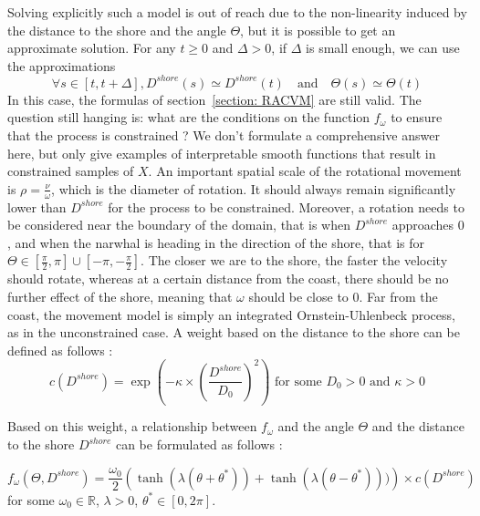 \documentclass[11pt]{article}
\newcommand {\R}{\mathbb{R}}
\newcommand {\1}{\mathbb{1}}
\theoremstyle{definition}
\theoremstyle{remark}
\theoremstyle{remark}
\begin{document}
Solving explicitly such a model is out of reach due to the non-linearity induced by the distance to the shore and the angle $\Theta$, but it is possible to get an approximate solution.
For any $t \geq 0$ and $\Delta>0$, if $\Delta$ is small enough, we can use the approximations
\[\forall s \in [t,t+\Delta], D^{shore}(s) \simeq D^{shore}(t) \quad \mbox{and} \quad  \Theta(s)\simeq \Theta(t)\]
In this case, the formulas of section~\ref{section: RACVM} are still valid.
The question still hanging is: what are the conditions on the function $f_{\omega}$ to ensure that the process is constrained ?
We don't formulate a comprehensive answer here, but only give examples of interpretable smooth functions that result in constrained samples of $X$.
An important spatial scale of the rotational movement is $\rho=\frac{\nu}{\omega}$, which is the diameter of rotation. It should always remain significantly lower than $D^{shore}$ for the process to be constrained. Moreover, a rotation needs to be considered near the boundary of the domain, that is when $D^{shore}$ approaches $0$, and when the narwhal is heading in the direction of the shore, that is for $\Theta \in \left[\frac{\pi}{2},\pi\right] \cup \left[-\pi,-\frac{\pi}{2}\right]$.
The closer we are to the shore, the faster the velocity should rotate,
whereas at a certain distance from the coast, there should be no further effect of the shore, meaning that $\omega$ should be close to $0$. Far from the coast, the movement model is simply an integrated Ornstein-Uhlenbeck process, as in the unconstrained case.
A weight based on the distance to the shore can be defined as follows :
\[c(D^{shore})=\exp\left(-\kappa \times \left(\frac{D^{shore}}{D_0}\right)^2\right)\mbox{ for some } D_0>0 \mbox{ and } \kappa>0\]

Based on this weight, a relationship between $f_{\omega}$ and the angle $\Theta$ and the distance to the shore $D^{shore}$ can be formulated as follows :

\begin{equation}
f_{\omega}(\Theta,D^{shore})=\frac{\omega_0}{2}\left(\tanh(\lambda(\theta+\theta^{*}))+\tanh(\lambda(\theta-\theta^{*})))\right)\times c(D^{shore})
\label{eq: smooth omega}
\end{equation}
for some $\omega_0 \in \R$, $\lambda>0$, $\theta^* \in [0,2\pi]$.
\end{document}
